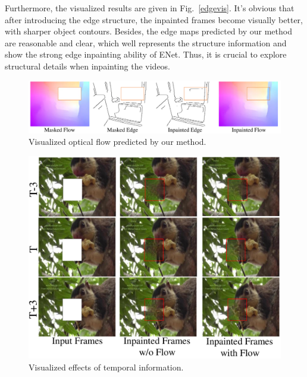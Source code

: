 Furthermore, the visualized results are given in Fig.~\ref{edgevis}. It's obvious that after introducing the edge structure, the inpainted frames become visually better, with sharper object contours. Besides, the edge maps predicted by our method are reasonable and clear, which well represents the structure information and show the strong edge inpainting ability of ENet.
Thus, it is crucial to explore structural details when inpainting the videos.






\begin{figure}[t]
	\centering
	\includegraphics[width=1.0\columnwidth]{flowvis} %
	\caption{Visualized optical flow predicted by our method.}
	\label{flowvis}
\end{figure}
\begin{figure}[t]
	\centering
	\includegraphics[width=1.0\columnwidth]{flow_vis} %
	\caption{Visualized effects of temporal information.}
	\label{flow_vis}
\end{figure}


